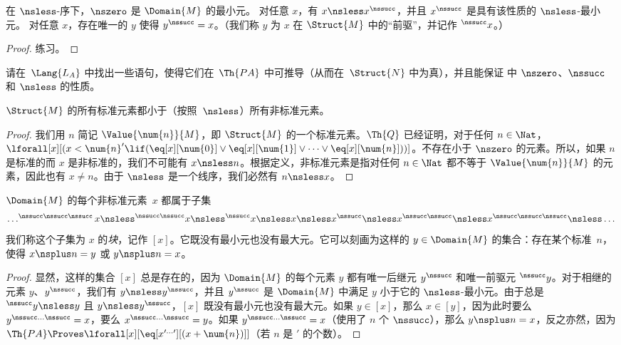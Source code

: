\documentclass[../../../include/open-logic-section]{subfiles}
\begin{document}
\begin{prop}
在 $\nsless$-序下，$\nszero$ 是 $\Domain{M}$ 的最小元。
对任意 $x$，有 $x \nsless x^\nssucc$，并且 $x^\nssucc$ 是具有该性质的 $\nsless$-最小元。
对任意 $x$，存在唯一的 $y$ 使得 $y^\nssucc = x$。（我们称 $y$ 为 $x$ 在 $\Struct{M}$ 中的“前驱”，并记作 $^\nssucc x$。）
\end{prop}

\begin{proof}
练习。
\end{proof}

\begin{prob}
请在~$\Lang{L_A}$ 中找出一些语句，使得它们在~$\Th{PA}$ 中可推导（从而在~$\Struct{N}$ 中为真），并且能保证
 中 $\nszero$、$\nssucc$ 和 $\nsless$ 的性质。
\end{prob}

\begin{prop}
$\Struct{M}$ 的所有标准元素都小于（按照~$\nsless$）所有非标准元素。
\end{prop}

\begin{proof}
我们用 $n$ 简记 $\Value{\num{n}}{M}$，即 $\Struct{M}$ 的一个标准元素。$\Th{Q}$ 已经证明，对于任何 $n \in \Nat$，$\lforall[x][(x < \num{n}' \lif (\eq[x][\num{0}] \lor
  \eq[x][\num{1}] \lor \dots \lor \eq[x][\num{n}]))]$。不存在小于 $\nszero$ 的元素。所以，如果 $n$ 是标准的而 $x$ 是非标准的，我们不可能有 $x \nsless n$。根据定义，非标准元素是指对任何 $n \in \Nat$ 都不等于 $\Value{\num{n}}{M}$ 的元素，因此也有 $x \neq n$。由于 $\nsless$ 是一个线序，我们必然有 $n \nsless x$。
\end{proof}

\begin{prop}
$\Domain{M}$ 的每个非标准元素~$x$ 都属于子集 \[
\dots ^{\nssucc\nssucc\nssucc}x \nsless ^{\nssucc\nssucc}x \nsless
^{\nssucc}x \nsless x \nsless x^{\nssucc} \nsless x^{\nssucc\nssucc}
\nsless x^{\nssucc\nssucc\nssucc} \nsless \dots
\]
我们称这个子集为 $x$ 的\emph{块}，记作 $[x]$。它既没有最小元也没有最大元。它可以刻画为这样的 $y \in \Domain{M}$ 的集合：存在某个标准~$n$，使得 $x \nsplus n = y$ 或 $y \nsplus n = x$。
\end{prop}

\begin{proof}
显然，这样的集合 $[x]$ 总是存在的，因为 $\Domain{M}$ 的每个元素 $y$ 都有唯一后继元 $y^\nssucc$ 和唯一前驱元 $^\nssucc y$。对于相继的元素 $y$、$y^\nssucc$，我们有 $y \nsless y^\nssucc$，并且 $y^\nssucc$ 是 $\Domain{M}$ 中满足 $y$ 小于它的 $\nsless$-最小元。由于总是 $^\nssucc y \nsless y$ 且 $y \nsless y^\nssucc$，$[x]$ 既没有最小元也没有最大元。如果 $y \in [x]$，那么 $x \in [y]$，因为此时要么 $y^{\nssucc\dots\nssucc} = x$，要么 $x^{\nssucc\dots\nssucc} = y$。如果 $y^{\nssucc\dots\nssucc} = x$（使用了 $n$ 个 $\nssucc$），那么 $y \nsplus n = x$，反之亦然，因为 $\Th{PA} \Proves \lforall[x][\eq[x^{\prime\dots\prime}][(x +
    \num{n})]]$（若 $n$ 是 $\prime$ 的个数）。
\end{proof}
\end{document}
